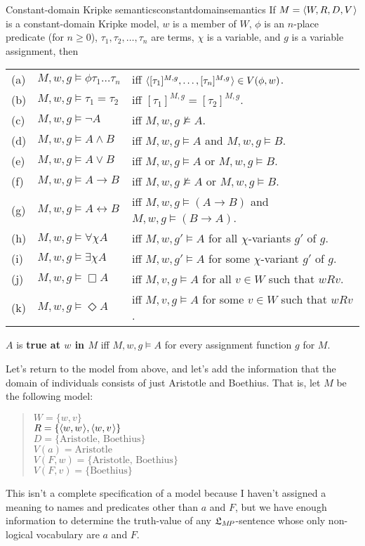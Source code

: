 \begin{definition}{Constant-domain Kripke semantics}{constantdomainsemantics}
  If $\Mfr = \t{W,R,D,V}$ is a constant-domain Kripke model, $w$ is a member of
  $W$, $\phi$ is an $n$-place predicate (for $n\geq 0$),
  $\tau_1,\tau_{2},\ldots,\tau_{n}$ are terms, $\chi$ is a variable, and $g$ is a
  variable assignment, then
  
  \medskip\hspace{-4mm}
  \begin{tabular}{lll}
    (a) & $M,w,g \models \phi \tau_1\ldots \tau_n$ &iff $\t{[\tau_1]^{M,g},\ldots,[\tau_n]^{M,g}} \in V(\phi,w)$.\\
    (b) & $M,w,g \models \tau_1=\tau_2$ &iff $[\tau_1]^{M,g} = [\tau_2]^{M,g}$.\\
    (c) & $M,w,g \models \neg A$ &iff $M,w,g \not\models A$.\\
    (d) & $M,w,g \models A \land B$ &iff $M,w,g \models A$ and $M,w,g \models B$.\\
    (e) & $M,w,g \models A \lor B$ &iff $M,w,g \models A$ or $M,w,g \models B$.\\
    (f) & $M,w,g \models A \to B$ &iff $M,w,g \not\models A$ or $M,w,g \models B$.\\
    (g) & $M,w,g \models A \leftrightarrow B$ &iff $M,w,g \models (A\to B)$ and $M,w,g \models (B\to A)$.\\
    (h) & $M,w,g \models \forall \chi A$ &iff $M,w,g' \models A$ for all $\chi$-variants $g'$ of $g$.\\
    (i) & $M,w,g \models \exists \chi A$ &iff $M,w,g' \models A$ for some $\chi$-variant $g'$ of $g$.\\
    (j) & $M,w,g \models \Box A$ &iff $M,v,g \models A$ for all $v\in W$ such that $wRv$.\\
    (k) & $M,w,g \models \Diamond A$ &iff $M,v,g \models A$ for some $v\in W$ such that $wRv$.
  \end{tabular}

  \medskip
  $A$ is \textbf{true at $w$ in $M$} iff $M,w,g \models A$ for
  every assignment function $g$ for $M$.

\end{definition}

Let's return to the model from above, and let's add the information that the
domain of individuals consists of just Aristotle and Boethius. That is, let $M$
be the following model:
%
\begin{quote}
  $W = \{ w,v \}$\\
  $R = \{ \t{w,w}, \t{w,v} \}$\\
  $D = \{ \text{Aristotle, Boethius} \}$\\
  $V(a) = \text{Aristotle}$\\
  $V(F,w) = \{ \text{Aristotle, Boethius} \}$\\
  $V(F,v) = \{ \text{Boethius} \}$
\end{quote}
%
This isn't a complete specification of a model because I haven't assigned a
meaning to names and predicates other than $a$ and $F$, but we have enough
information to determine the truth-value of any $\mathfrak{L}_{M\!P}$-sentence whose only
non-logical vocabulary are $a$ and $F$.

